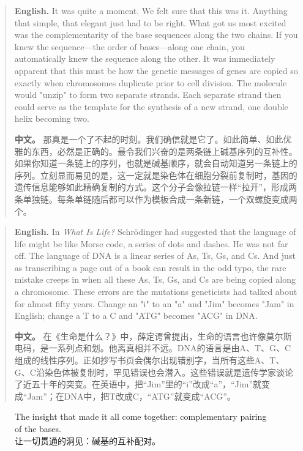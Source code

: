 \begin{quote}
\noindent\textbf{English.} It was quite a moment. We felt sure that this was it. Anything that simple, that elegant just had to be right. What got us most excited was the complementarity of the base sequences along the two chains. If you knew the sequence---the order of bases---along one chain, you automatically knew the sequence along the other. It was immediately apparent that this must be how the genetic messages of genes are copied so exactly when chromosomes duplicate prior to cell division. The molecule would "unzip" to form two separate strands. Each separate strand then could serve as the template for the synthesis of a new strand, one double helix becoming two.

\smallskip
\noindent\textbf{中文。} 那真是一个了不起的时刻。我们确信就是它了。如此简单、如此优雅的东西，必然是正确的。最令我们兴奋的是两条链上碱基序列的互补性。如果你知道一条链上的序列，也就是碱基顺序，就会自动知道另一条链上的序列。立刻显而易见的是，这一定就是染色体在细胞分裂前复制时，基因的遗传信息能够如此精确复制的方式。这个分子会像拉链一样“拉开”，形成两条单独链。每条单链随后都可以作为模板合成一条新链，一个双螺旋变成两个。
\end{quote}

\begin{quote}
\noindent\textbf{English.} In \emph{What Is Life?} Schrödinger had suggested that the language of life might be like Morse code, a series of dots and dashes. He was not far off. The language of DNA is a linear series of As, Ts, Gs, and Cs. And just as transcribing a page out of a book can result in the odd typo, the rare mistake creeps in when all these As, Ts, Gs, and Cs are being copied along a chromosome. These errors are the mutations geneticists had talked about for almost fifty years. Change an "i" to an "a" and "Jim" becomes "Jam" in English; change a T to a C and "ATG" becomes "ACG" in DNA.

\smallskip
\noindent\textbf{中文。} 在《生命是什么？》中，薛定谔曾提出，生命的语言也许像莫尔斯电码，是一系列点和划。他离真相并不远。DNA的语言是由A、T、G、C组成的线性序列。正如抄写书页会偶尔出现错别字，当所有这些A、T、G、C沿染色体被复制时，罕见错误也会潜入。这些错误就是遗传学家谈论了近五十年的突变。在英语中，把“Jim”里的“i”改成“a”，“Jim”就变成“Jam”；在DNA中，把T改成C，“ATG”就变成“ACG”。
\end{quote}

\begin{figure}[htbp]
\centering
{}
\hfill
{}
\caption{The insight that made it all come together: complementary pairing of the bases.\\让一切贯通的洞见：碱基的互补配对。}
\end{figure}

